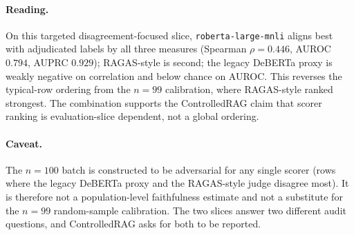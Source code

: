 \begin{table}[!htb]
\centering
\caption{Two-rater adjudicated $n=100$ targeted scorer-disagreement
evaluation. The slice is constructed to be adversarial for any single
scorer; the ranking here is \emph{not} the typical-row ranking from
the $n=99$ calibration. Raw inter-rater agreement is $0.88$; Cohen's
$\kappa = 0.721$. The adjudicated distribution is $74$ \texttt{faithful}
/ $26$ \texttt{hallucinated} / $0$ \texttt{unclear}.}
\label{tab:supp:disagreement_alignment}
\footnotesize
{}
\end{table}

\paragraph{Reading.} On this targeted disagreement-focused slice,
\texttt{roberta-large-mnli} aligns best with adjudicated labels by all
three measures (Spearman $\rho = 0.446$, AUROC $0.794$, AUPRC $0.929$);
RAGAS-style is second; the legacy DeBERTa proxy is weakly negative on
correlation and below chance on AUROC. This reverses the typical-row
ordering from the $n=99$ calibration, where RAGAS-style ranked
strongest. The combination supports the ControlledRAG claim that
scorer ranking is evaluation-slice dependent, not a global ordering.

\paragraph{Caveat.} The $n=100$ batch is constructed to be adversarial
for any single scorer (rows where the legacy DeBERTa proxy and the
RAGAS-style judge disagree most). It is therefore not a population-level
faithfulness estimate and not a substitute for the $n=99$ random-sample
calibration. The two slices answer two different audit questions, and
ControlledRAG asks for both to be reported.

